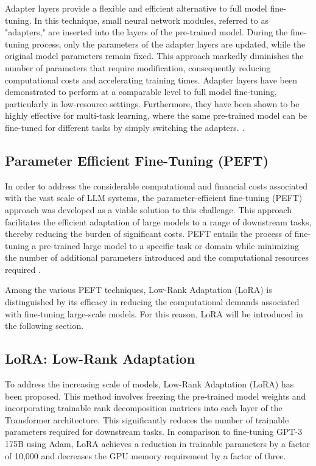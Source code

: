 Adapter layers provide a flexible and efficient alternative to full model fine-tuning. In this technique, small neural network modules, referred to as "adapters," are inserted into the layers of the pre-trained model. During the fine-tuning process, only the parameters of the adapter layers are updated, while the original model parameters remain fixed. This approach markedly diminishes the number of parameters that require modification, consequently reducing computational costs and accelerating training times. Adapter layers have been demonstrated to perform at a comparable level to full model fine-tuning, particularly in low-resource settings. Furthermore, they have been shown to be highly effective for multi-task learning, where the same pre-trained model can be fine-tuned for different tasks by simply switching the adapters. \cite{houlsby2019parameter}.

\subsection{Parameter Efficient Fine-Tuning (PEFT)}

In order to address the considerable computational and financial costs associated with the vast scale of LLM systems, the parameter-efficient fine-tuning (PEFT) approach was developed as a viable solution to this challenge. This approach facilitates the efficient adaptation of large models to a range of downstream tasks, thereby reducing the burden of significant costs. PEFT entails the process of fine-tuning a pre-trained large model to a specific task or domain while minimizing the number of additional parameters introduced and the computational resources required \cite{han2024parameter}.

Among the various PEFT techniques, Low-Rank Adaptation (LoRA) is distinguished by its efficacy in reducing the computational demands associated with fine-tuning large-scale models. For this reason, LoRA will be introduced in the following section.

\subsection{LoRA: Low-Rank Adaptation}

To address the increasing scale of models, Low-Rank Adaptation (LoRA) has been proposed. This method involves freezing the pre-trained model weights and incorporating trainable rank decomposition matrices into each layer of the Transformer architecture. This significantly reduces the number of trainable parameters required for downstream tasks. In comparison to fine-tuning GPT-3 175B using Adam, LoRA achieves a reduction in trainable parameters by a factor of 10,000 and decreases the GPU memory requirement by a factor of three.

